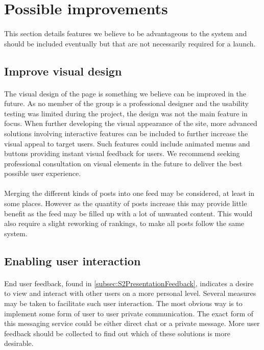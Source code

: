 \section{Possible improvements}
\label{sec:FurtherImprovements}

\paragraph{} This section details features we believe to be advantageous to the system and should be included eventually but that are not necessarily required for a launch.

\subsection{Improve visual design}
\label{subsec:FurtherImprovementsVisDesign}

\paragraph{} The visual design of the page is something we believe can be improved in the future. As no member of the group is a professional designer and the usability testing was limited during the project, the design was not the main feature in focus. When further developing the visual appearance of the site, more advanced solutions involving interactive features can be included to further increase the visual appeal to target users. Such features could include animated menus and buttons providing instant visual feedback for users. We recommend seeking professional consultation on visual elements in the future to deliver the best possible user experience.
\paragraph{} Merging the different kinds of posts into one feed may be considered, at least in some places. However as the quantity of posts increase this may provide little benefit as the feed may be filled up with a lot of unwanted content. This would also require a slight reworking of rankings, to make all posts follow the same system.

\subsection{Enabling user interaction}
\label{subsec:FurtherImprovementsInteraction}

\paragraph{} End user feedback, found in \ref{subsec:S2PresentationFeedback}, indicates a desire to view and interact with other users on a more personal level. Several measures may be taken to facilitate such user interaction. The most obvious way is to implement some form of user to user private communication. The exact form of this messaging service could be either direct chat or a private message. More user feedback should be collected to find out which of these solutions is more desirable.
